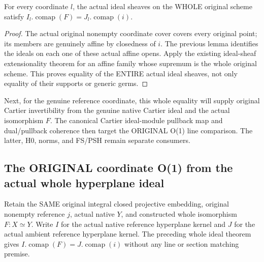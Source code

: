 \begin{theorem}
\label{thm:seven-original-native-hyperplane-ideals-whole-route}
\leanok
{}
For every coordinate $l$, the actual ideal sheaves on the WHOLE original
scheme satisfy $I_l.\operatorname{comap}(F)=J_l.\operatorname{comap}(i)$.
\end{theorem}
\begin{proof}
The actual original nonempty coordinate cover covers every original point;
its members are genuinely affine by closedness of $i$. The previous lemma
identifies the ideals on each one of these actual affine opens. Apply the
existing ideal-sheaf extensionality theorem for an affine family whose
supremum is the whole original scheme. This proves equality of the ENTIRE
actual ideal sheaves, not only equality of their supports or generic germs.
\end{proof}

Next, for the genuine reference coordinate, this whole equality will
supply original Cartier invertibility from the genuine native Cartier
ideal and the actual isomorphism $F$. The canonical Cartier ideal-module
pullback map and dual/pullback coherence then target the ORIGINAL O(1)
line comparison. The latter, H0, norms, and FS/PSH remain separate consumers.
\subsection{The ORIGINAL coordinate O(1) from the actual whole hyperplane ideal}
Retain the SAME original integral closed projective embedding, original
nonempty reference $j$, actual native $Y$, and constructed whole
isomorphism $F:X\simeq Y$. Write $I$ for the actual native reference
hyperplane kernel and $J$ for the actual ambient reference hyperplane
kernel. The preceding whole ideal theorem gives $I.\operatorname{comap}(F)
=J.\operatorname{comap}(i)$ without any line or section matching premise.

